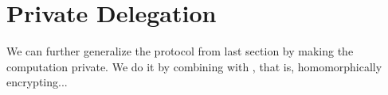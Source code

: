 \section{Private Delegation}

We can further generalize the protocol from last section by making the computation private. We do it by combining with \cite{mahadev_qfhe}, that is, homomorphically encrypting...


